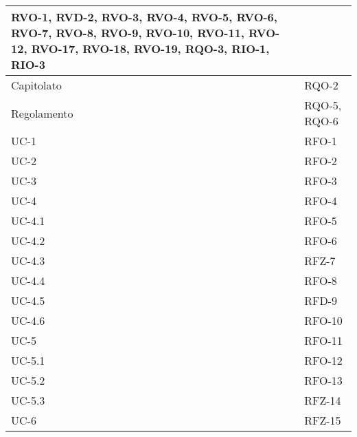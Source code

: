 \begin{xltabular}{\textwidth}{|X| X |}
                RVO-1, \newline 
                RVD-2, \newline
                RVO-3, \newline
                RVO-4, \newline
                RVO-5, \newline
                RVO-6, \newline
                RVO-7, \newline
                RVO-8, \newline
                RVO-9, \newline
                RVO-10, \newline
                RVO-11, \newline
                RVO-12, \newline
                RVO-17, \newline
                RVO-18, \newline
                RVO-19, \newline
                RQO-3, \newline
                RIO-1, \newline
                RIO-3 \\
    \hline
    Capitolato & RQO-2 \\
    \hline
    Regolamento & RQO-5, \newline 
                 RQO-6 \\
    \hline
    UC-1 & RFO-1  \\
    \hline
    UC-2 & RFO-2  \\
    \hline
    UC-3 & RFO-3  \\
    \hline
    UC-4 & RFO-4 \\
    \hline
    UC-4.1 & RFO-5\\
    \hline
    UC-4.2 & RFO-6\\
    \hline
    UC-4.3 & RFZ-7 \\
    \hline
    UC-4.4 & RFO-8\\ 
    \hline
    UC-4.5 & RFD-9\\
    \hline
    UC-4.6 & RFO-10\\
    \hline
    UC-5 & RFO-11\\
    \hline
    UC-5.1 & RFO-12\\
    \hline
    UC-5.2 & RFO-13\\
    \hline
    UC-5.3 & RFZ-14 \\
    \hline
    UC-6 & RFZ-15\\

\end{xltabular}
